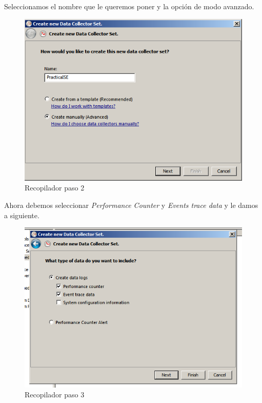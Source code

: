 Seleccionamos el nombre que le queremos poner y la opción de modo avanzado.
\begin{figure}[H] %
	\centering
	\includegraphics[scale=0.5]{pics/recopilador2.png}  %
	\caption{Recopilador paso 2} \label{fig:reco2}
\end{figure}

Ahora debemos seleccionar \textit{Performance Counter} y \textit{Events trace data} y le damos a siguiente.

\begin{figure}[H] %
	\centering
	\includegraphics[scale=0.5]{pics/recopilador3.png}  %
	\caption{Recopilador paso 3} \label{fig:reco3}
\end{figure}


